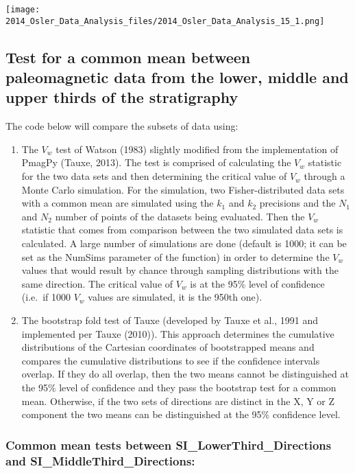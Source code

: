 \documentclass[letterpaper,10pt,english]{/Users/polarwander/Library/Enthought/Canopy_64bit/User/lib/python2.7/site-packages/sphinx/texinputs/sphinxhowto}
\newenvironment{InvisibleVerbatim}
        {\begin{mdframed}[leftmargin=0.1\linewidth,innerleftmargin=3pt,innerrightmargin=3pt, userdefinedwidth=1\linewidth, linewidth=0pt, linecolor=white, usetwoside=false]}
        {\end{mdframed}}
\begin{document}
                \begin{InvisibleVerbatim}
                \vspace{-0.5\baselineskip}
    \begin{center}
    \texttt{[image: 2014\_Osler\_Data\_Analysis\_files/2014\_Osler\_Data\_Analysis\_15\_1.png]}
    \par
    \end{center}
    
            \end{InvisibleVerbatim}
            
        
    
\subsection{Test for a common mean between paleomagnetic data from the lower, middle
and upper thirds of the stratigraphy}The code below will compare the subsets of data using:

\begin{enumerate}
\def\labelenumi{\arabic{enumi}.}
\itemsep1pt\parskip0pt
\item
  The $V_w$ test of Watson (1983) slightly modified from the
  implementation of PmagPy (Tauxe, 2013). The test is comprised of
  calculating the $V_w$ statistic for the two data sets and then
  determining the critical value of $V_w$ through a Monte Carlo
  simulation. For the simulation, two Fisher-distributed data sets with
  a common mean are simulated using the $k_1$ and $k_2$ precisions and
  the $N_1$ and $N_2$ number of points of the datasets being evaluated.
  Then the $V_w$ statistic that comes from comparison between the two
  simulated data sets is calculated. A large number of simulations are
  done (default is 1000; it can be set as the NumSims parameter of the
  function) in order to determine the $V_w$ values that would result by
  chance through sampling distributions with the same direction. The
  critical value of $V_w$ is at the 95\% level of confidence (i.e.~if
  1000 $V_w$ values are simulated, it is the 950th one).
\item
  The bootstrap fold test of Tauxe (developed by Tauxe et al., 1991 and
  implemented per Tauxe (2010)). This approach determines the cumulative
  distributions of the Cartesian coordinates of bootstrapped means and
  compares the cumulative distributions to see if the confidence
  intervals overlap. If they do all overlap, then the two means cannot
  be distinguished at the 95\% level of confidence and they pass the
  bootstrap test for a common mean. Otherwise, if the two sets of
  directions are distinct in the X, Y or Z component the two means can
  be distinguished at the 95\% confidence level.
\end{enumerate}\subsubsection{Common mean tests between SI\_LowerThird\_Directions and
SI\_MiddleThird\_Directions:}
\end{document}
